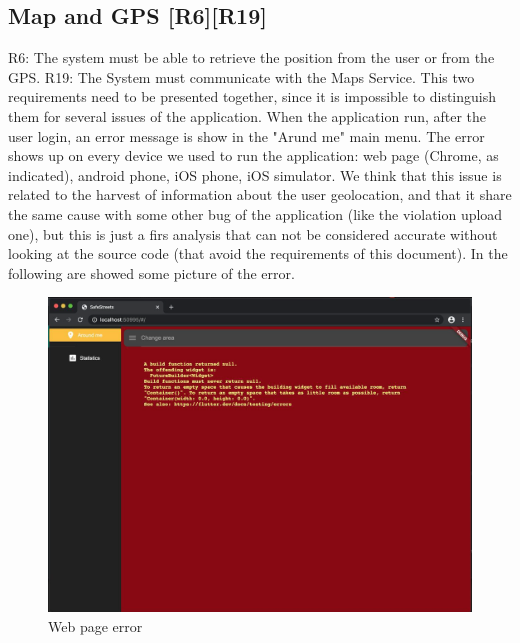 \documentclass[../ATD.tex]{subfiles}
\begin{document}
    \subsection{Map and GPS [R6][R19]}\label{subsec:map-and-gps}
    R6: The system must be able to retrieve the position from the user or from the GPS.
    \newline
    R19: The System must communicate with the Maps Service.
    \newline
    This two requirements need to be presented together, since it is impossible to distinguish them for several issues of the application.
    \newline
    When the application run, after the user login, an error message is show in the "Arund me" main menu.
    The error shows up on every device we used to run the application: web page (Chrome, as indicated), android phone, iOS phone, iOS simulator.
    We think that this issue is related to the harvest of information about the user geolocation, and that it share the same cause with some other bug of the application (like the violation upload one), but this is just a firs analysis that can not be considered accurate without looking at the source code (that avoid the requirements of this document).
    In the following are showed some picture of the error.
    \begin{figure}[H]
        \centering
        \includegraphics{../assets/web_page_error.png}
        \caption{Web page error}
    \end{figure}
\end{document}
